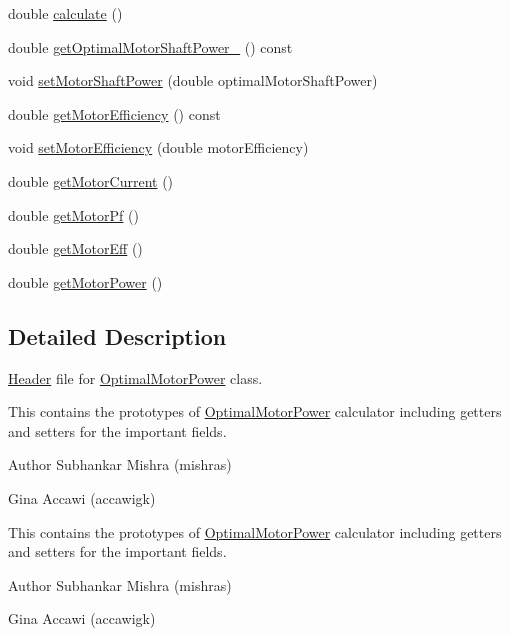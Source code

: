 \begin{DoxyCompactItemize}
\item 
double \hyperlink{class_optimal_motor_power_a8db12b796c148e0130b261ae138057bf}{calculate} ()
\item 
double \hyperlink{class_optimal_motor_power_af902365015880d5f11d865465672d7bb}{get\+Optimal\+Motor\+Shaft\+Power\+\_\+} () const
\item 
void \hyperlink{class_optimal_motor_power_ada8a9e3caac34c54470ad13ffe7edf53}{set\+Motor\+Shaft\+Power} (double optimal\+Motor\+Shaft\+Power)
\item 
double \hyperlink{class_optimal_motor_power_a10b3528bec621cab146608c6326526e3}{get\+Motor\+Efficiency} () const
\item 
void \hyperlink{class_optimal_motor_power_a297acce2fcd06a57108fb52058a61cac}{set\+Motor\+Efficiency} (double motor\+Efficiency)
\item 
double \hyperlink{class_optimal_motor_power_a2c058c4320a840018a420e10272cc4dd}{get\+Motor\+Current} ()
\item 
double \hyperlink{class_optimal_motor_power_a94d4c8a84c1bd19b799e35b966368f5a}{get\+Motor\+Pf} ()
\item 
double \hyperlink{class_optimal_motor_power_a341fe7520227f27f9cce23f3dc4cb0cb}{get\+Motor\+Eff} ()
\item 
double \hyperlink{class_optimal_motor_power_af35a32c24df9198bcf0df5b8f6ea03a9}{get\+Motor\+Power} ()
\end{DoxyCompactItemize}


\subsection{Detailed Description}
\hyperlink{class_header}{Header} file for \hyperlink{class_optimal_motor_power}{Optimal\+Motor\+Power} class. 

This contains the prototypes of \hyperlink{class_optimal_motor_power}{Optimal\+Motor\+Power} calculator including getters and setters for the important fields.

\begin{DoxyAuthor}{Author}
Subhankar Mishra (mishras) 

Gina Accawi (accawigk) 
\end{DoxyAuthor}


This contains the prototypes of \hyperlink{class_optimal_motor_power}{Optimal\+Motor\+Power} calculator including getters and setters for the important fields.

\begin{DoxyAuthor}{Author}
Subhankar Mishra (mishras) 

Gina Accawi (accawigk) 
\end{DoxyAuthor}


